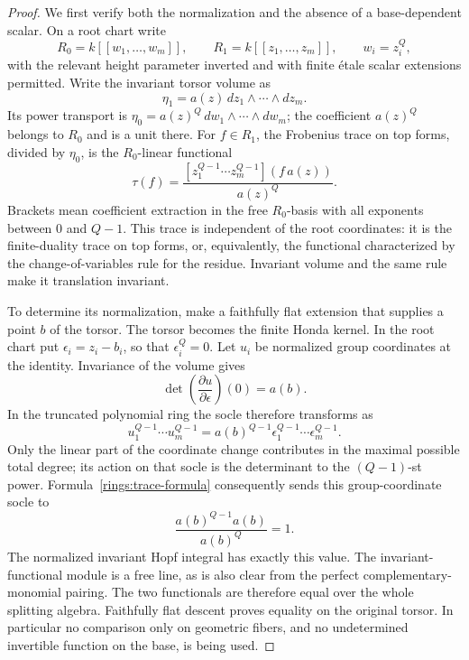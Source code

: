 \begin{proof}
We first verify both the normalization and the absence
of a base-dependent scalar.  On a root chart write
\[
 R_0=k[[w_1,\ldots,w_m]],\qquad
 R_1=k[[z_1,\ldots,z_m]],\qquad w_i=z_i^Q,
\]
with the relevant height parameter inverted and with
finite \'etale scalar extensions permitted.  Write
the invariant torsor volume as
\[
 \eta_1=a(z)\,dz_1\wedge\cdots\wedge dz_m.
\]
Its power transport is
$\eta_0=a(z)^Q\,dw_1\wedge\cdots\wedge dw_m$;
the coefficient $a(z)^Q$ belongs to $R_0$ and is a
unit there.  For $f\in R_1$, the Frobenius trace on
top forms, divided by $\eta_0$, is the $R_0$-linear
functional
\begin{equation}\label{rings:trace-formula}
 \tau(f)=
 \frac{[z_1^{Q-1}\cdots z_m^{Q-1}](f\,a(z))}
      {a(z)^Q}.
\end{equation}
Brackets mean coefficient extraction in the free
$R_0$-basis with all exponents between $0$ and $Q-1$.
This trace is independent of the root coordinates:
it is the finite-duality trace on top forms, or,
equivalently, the functional characterized by the
change-of-variables rule for the residue.  Invariant
volume and the same rule make it translation invariant.

To determine its normalization, make a faithfully
flat extension that supplies a point $b$ of the torsor.
The torsor becomes the finite Honda kernel.  In the
root chart put $\epsilon_i=z_i-b_i$, so that
$\epsilon_i^Q=0$.  Let $u_i$ be normalized group
coordinates at the identity.  Invariance of the
volume gives
\[
 \det\left(\frac{\partial u}{\partial\epsilon}\right)(0)
       =a(b).
\]
In the truncated polynomial ring the socle therefore
transforms as
\[
 u_1^{Q-1}\cdots u_m^{Q-1}
    =a(b)^{Q-1}\epsilon_1^{Q-1}\cdots\epsilon_m^{Q-1}.
\]
Only the linear part of the coordinate change
contributes in the maximal possible total degree;
its action on that socle is the determinant to the
$(Q-1)$-st power.  Formula~\eqref{rings:trace-formula}
consequently sends this group-coordinate socle to
\[
 \frac{a(b)^{Q-1}a(b)}{a(b)^Q}=1.
\]
The normalized invariant Hopf integral has exactly
this value.  The invariant-functional module is a
free line, as is also clear from the perfect
complementary-monomial pairing.  The two functionals
are therefore equal over the whole splitting
algebra.  Faithfully flat descent proves equality
on the original torsor.  In particular no
comparison only on geometric fibers, and no
undetermined invertible function on the base, is
being used.


\end{proof}
